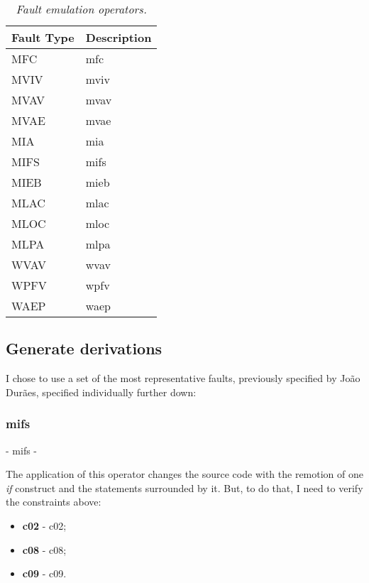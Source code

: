 \begin{table}[!ht]
\begin{tabular}{|l|p{12cm}|}
\hline
\textbf{Fault Type}		& \multicolumn{1}{c|}{\textbf{Description}}		\\ \hline \hline
MFC        				& \Acl{mfc}  									\\ \hline
MVIV       				& \Acl{mviv} 									\\ \hline
MVAV       				& \Acl{mvav} 									\\ \hline
MVAE       				& \Acl{mvae} 									\\ \hline
MIA        				& \Acl{mia}  									\\ \hline
MIFS       				& \Acl{mifs} 									\\ \hline
MIEB       				& \Acl{mieb} 									\\ \hline
MLAC       				& \Acl{mlac} 									\\ \hline
MLOC       				& \Acl{mloc} 									\\ \hline
MLPA       				& \Acl{mlpa} 									\\ \hline
WVAV       				& \Acl{wvav} 									\\ \hline
WPFV       				& \Acl{wpfv} 									\\ \hline
WAEP       				& \Acl{waep} 									\\ \hline
\end{tabular}
\caption{\small \sl Fault emulation operators.\label{tab:faultEmulationOperators}}
\end{table}

\subsection{Generate derivations}

I chose to use a set of the most representative faults, previously specified by João Durães\cite{duraes2006emulation}, specified individually further down:

	\hypertarget{mifs}{}
	\subsubsection{\textbf{\acs{mifs}}} - \Acl{mifs} - 

	The application of this operator changes the source code with the remotion of one \textit{if} construct and the statements surrounded by it.
	But, to do that, I need to verify the constraints above:
	\begin{itemize}
		\item \textbf{\acs{c02}} - \Acl{c02};
		\item \textbf{\acs{c08}} - \Acl{c08};
		\item \textbf{\acs{c09}} - \Acl{c09}.
	\end{itemize}

